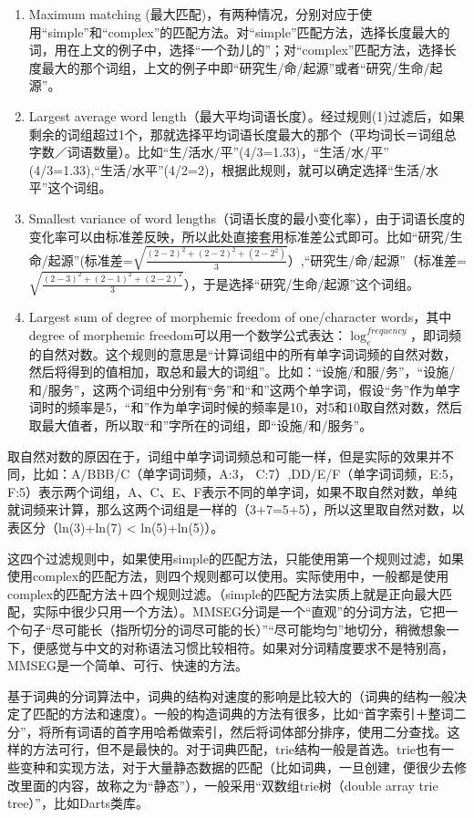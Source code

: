 \begin{enumerate}[(1)]
\item Maximum matching (最大匹配)，有两种情况，分别对应于使用“simple”和“complex”的匹配方法。对“simple”匹配方法，选择长度最大的词，用在上文的例子中，选择“一个劲儿的”；对“complex”匹配方法，选择长度最大的那个词组，上文的例子中即“研究生/命/起源”或者“研究/生命/起源”。
\item Largest average word length（最大平均词语长度）。经过规则(1)过滤后，如果剩余的词组超过1个，那就选择平均词语长度最大的那个（平均词长＝词组总字数／词语数量）。比如“生/活水/平”(4/3=1.33)，“生活/水/平” (4/3=1.33),“生活/水平”(4/2=2)，根据此规则，就可以确定选择“生活/水平”这个词组。
\item Smallest variance of word lengths（词语长度的最小变化率），由于词语长度的变化率可以由标准差反映，所以此处直接套用标准差公式即可。比如“研究/生命/起源”(标准差=$\sqrt{\frac{(2-2)^2+(2-2)^2+(2-2^2)}{3}}$）,“研究生/命/起源”（标准差=$\sqrt{\frac{(2-3)^2+(2-1)^2+(2-2)^2}{3}}$），于是选择“研究/生命/起源”这个词组。
\item Largest sum of degree of morphemic freedom of one/character words，其中degree of morphemic freedom可以用一个数学公式表达：$\log_e^{frequency}$，即词频的自然对数。这个规则的意思是“计算词组中的所有单字词词频的自然对数，然后将得到的值相加，取总和最大的词组”。比如：“设施/和服/务”，“设施/和/服务”，这两个词组中分别有“务”和“和”这两个单字词，假设“务”作为单字词时的频率是5，“和”作为单字词时候的频率是10，对5和10取自然对数，然后取最大值者，所以取“和”字所在的词组，即“设施/和/服务”。
\end{enumerate}
\par 取自然对数的原因在于，词组中单字词词频总和可能一样，但是实际的效果并不同，比如：A/BBB/C（单字词词频，A:3， C:7）,DD/E/F（单字词词频，E:5，F:5）表示两个词组，A、C、E、F表示不同的单字词，如果不取自然对数，单纯就词频来计算，那么这两个词组是一样的（3+7=5+5），所以这里取自然对数，以表区分（ln(3)+ln(7) < ln(5)+ln(5)）。
\par 这四个过滤规则中，如果使用simple的匹配方法，只能使用第一个规则过滤，如果使用complex的匹配方法，则四个规则都可以使用。实际使用中，一般都是使用complex的匹配方法＋四个规则过滤。（simple的匹配方法实质上就是正向最大匹配，实际中很少只用一个方法）。MMSEG分词是一个“直观”的分词方法，它把一个句子“尽可能长（指所切分的词尽可能的长）”“尽可能均匀”地切分，稍微想象一下，便感觉与中文的对称语法习惯比较相符。如果对分词精度要求不是特别高，MMSEG是一个简单、可行、快速的方法。
\par 基于词典的分词算法中，词典的结构对速度的影响是比较大的（词典的结构一般决定了匹配的方法和速度）。一般的构造词典的方法有很多，比如“首字索引＋整词二分”，将所有词语的首字用哈希做索引，然后将词体部分排序，使用二分查找。这样的方法可行，但不是最快的。对于词典匹配，trie结构一般是首选。trie也有一些变种和实现方法，对于大量静态数据的匹配（比如词典，一旦创建，便很少去修改里面的内容，故称之为“静态”），一般采用“双数组trie树（double array trie tree）”，比如Darts类库。
